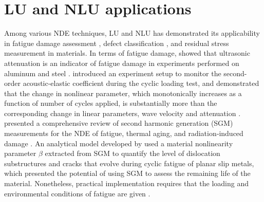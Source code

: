 \section{LU and NLU applications}
Among various NDE techniques, LU and NLU has demonstrated its applicability in fatigue damage assessment \cite{nde-lu-fatigue-JOSHI1972577, nde-nlu-fatigue-NAGY1998375,nde-nlu-review-Matlack2014, nde-nlu-fatigue-Cantrell}, defect classification \cite{nde-lu-ml-defect-Sambath2011,nde-lu-ml-defect-s19194216}, and residual stress measurement \cite{nde-lu-rs-Man1987,nde-lu-rs-TANALA199583,nde-lu-rs-LIU2018178} in materials. In terms of fatigue damage,  showed that ultrasonic attenuation is an indicator of fatigue damage in experiments performed on aluminum and steel \cite{nde-lu-fatigue-JOSHI1972577}.  introduced an experiment setup to monitor the second-order acoustic-elastic coefficient during the cyclic loading test, and demonstrated that the change in nonlinear parameter, which monotonically increases as a function of number of cycles applied, is substantially more than the corresponding change in linear parameters, wave velocity and attenuation \cite{nde-nlu-fatigue-NAGY1998375}.  presented a comprehensive review of second harmonic generation (SGM) measurements for the NDE of fatigue, thermal aging, and radiation‐induced damage \cite{nde-nlu-review-Matlack2014}. An analytical model developed by  used a material nonlinearity parameter $ \beta $ extracted from SGM to quantify the level of dislocation substructures and cracks that evolve during cyclic fatigue of planar slip metals, which presented the potential of using SGM to assess the remaining life of the material. Nonetheless, practical implementation requires that the loading and environmental conditions of fatigue are given \cite{nde-nlu-fatigue-Cantrell}.

